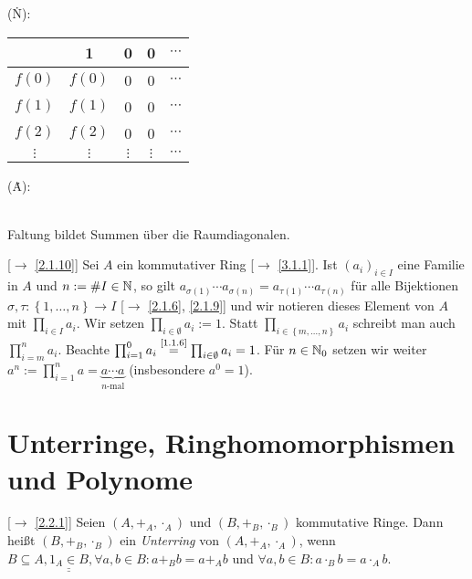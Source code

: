 \documentclass[../../main.tex]{subfiles}
\begin{document}
\begin{center}
(\. N):
\begin{tabular}{c|cccc}
 & 1 & 0 & 0 & $\cdots$\\\hline
 $f(0)$ & $f(0)$ & 0 & 0 & $\cdots$ \\
 $f(1)$ & $f(1)$ & 0 & 0 & $\cdots$ \\
 $f(2)$ & $f(2)$ & 0 & 0 & $\cdots$ \\
 $\vdots$ & $\vdots$ & $\vdots$ & $\vdots$ & $\cdots$
\end{tabular}
\qquad (\. A):
\begin{minipage}[h][][b]{0.5\textwidth}
\centering
{}\\
Faltung bildet Summen über die Raumdiagonalen.
\end{minipage}
\end{center}

\begin{nt}\mbox{}[$\to$ \ref{2.1.10}]\label{3.1.6}
Sei $A$ ein kommutativer Ring [$\to$ \ref{3.1.1}]. Ist $(a_i)_{i\in I}$ eine Familie in $A$ und $n:=\# I\in\mathbb N$, so gilt $a_{\sigma(1)}\cdots a_{\sigma(n)} = a_{\tau(1)}\cdots a_{\tau(n)}$ für alle Bijektionen $\sigma,\tau:\left\{1,\ldots,n\right\}\to I$ [$\to$ \ref{2.1.6}, \ref{2.1.9}] und wir notieren dieses Element von $A$ mit $\prod_{i\in I} a_i$. Wir setzen $\prod_{i\in\emptyset} a_i := 1$. Statt $\prod_{i\in\left\{m,\ldots,n\right\}}a_i$ schreibt man auch $\prod_{i=m}^n a_i$. Beachte $\prod_{i=1}^0 a_i \overset{\text{\ref{1.1.6}}}=\prod_{i\in\emptyset}a_i = 1$. Für $n\in\mathbb N_0$ setzen wir weiter $a^n:=\prod_{i=1}^n a=\underbrace{a\cdots a}_\text{$n$-mal}$ (insbesondere $a^0=1$).
\end{nt}

\section{Unterringe, Ringhomomorphismen und Polynome}

\begin{df}\mbox{}[$\to$ \ref{2.2.1}]\label{3.2.1}
Seien $(A,+_A,\cdot_A)$ und $(B,+_B,\cdot_B)$ kommutative Ringe. Dann heißt $(B,+_B,\cdot_B)$ ein \emph{Unterring} von $(A,+_A,\cdot_A)$, wenn $B\subseteq A,
\underline{\underline{1_A\in B}}, \forall a,b\in B: a+_B b = a+_A b$ und $\forall a,b\in B: a\cdot_B b = a\cdot_A b$.
\end{df}
\end{document}

